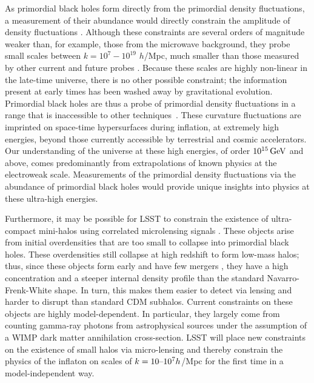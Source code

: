 As primordial black holes form directly from the primordial density fluctuations, a measurement of their abundance would directly constrain the amplitude of density fluctuations \citep{Carr:1974nx, Meszaros:1974}. %
Although these constraints are several orders of magnitude weaker than, for example, those from the microwave background, they probe small scales between $k = 10^{7} - 10^{19}$ $h$/Mpc, much smaller than those measured by other current and future probes \citep{Bringmann:2012}. Because these scales are highly non-linear in the late-time universe, there is no other possible constraint; the information present at early times has been washed away by gravitational evolution. Primordial black holes are thus a probe of primordial density fluctuations in a range that is inaccessible to other techniques~\citep{Josan:2009,Bellido:2017,Bellido:2018}. These curvature fluctuations are imprinted on space-time hypersurfaces during inflation, at extremely high energies, beyond those currently accessible by terrestrial and cosmic accelerators. 
Our understanding of the universe at these high energies, of order $10^{15} \mathrm{\,GeV}$ and above, comes predominantly from extrapolations of known physics at the electroweak scale.
Measurements of the primordial density fluctuations via the abundance of primordial black holes would provide unique insights into physics at these ultra-high energies.


Furthermore, it may be possible for LSST to constrain the existence of ultra-compact mini-halos using correlated microlensing signals \citep{erickcek2011,li2012}. These objects arise from initial overdensities that are too small to collapse into primordial black holes. These overdensities still collapse at high redshift to form low-mass halos; thus, since these objects form early and have few mergers \citep{Bringmann:2012,Delos:2018}, they have a high concentration and a steeper internal density profile than the standard Navarro-Frenk-White shape. In turn, this makes them easier to detect via lensing and harder to disrupt than standard CDM subhalos. Current constraints on these objects are highly model-dependent. In particular, they largely come from counting gamma-ray photons from astrophysical sources under the assumption of a WIMP dark matter annihilation cross-section. LSST will place new constraints on the existence of small halos via micro-lensing and thereby constrain the physics of the inflaton on scales of $k = 10 \textup{--} 10^7 h$/Mpc for the first time in a model-independent way.

